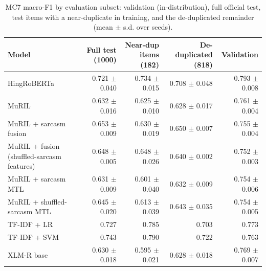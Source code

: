 \begin{table}[t]
\centering
\small
\caption{MC7 macro-F1 by evaluation subset: validation (in-distribution), full official test, test items with a near-duplicate in training, and the de-duplicated remainder (mean $\pm$ s.d. over seeds).}
\label{tab:tab05b_mc7_subsets}
\begin{tabular}{lrrrr}
\toprule
Model & Full test (1000) & Near-dup items (182) & De-duplicated (818) & Validation \\
\midrule
HingRoBERTa & 0.721 $\pm$ 0.040 & 0.734 $\pm$ 0.015 & 0.708 $\pm$ 0.048 & 0.793 $\pm$ 0.008 \\
MuRIL & 0.632 $\pm$ 0.016 & 0.625 $\pm$ 0.010 & 0.628 $\pm$ 0.017 & 0.761 $\pm$ 0.004 \\
MuRIL + sarcasm fusion & 0.653 $\pm$ 0.009 & 0.630 $\pm$ 0.019 & 0.650 $\pm$ 0.007 & 0.755 $\pm$ 0.004 \\
MuRIL + fusion (shuffled-sarcasm features) & 0.648 $\pm$ 0.005 & 0.648 $\pm$ 0.026 & 0.640 $\pm$ 0.002 & 0.752 $\pm$ 0.003 \\
MuRIL + sarcasm MTL & 0.631 $\pm$ 0.009 & 0.601 $\pm$ 0.040 & 0.632 $\pm$ 0.009 & 0.754 $\pm$ 0.006 \\
MuRIL + shuffled-sarcasm MTL & 0.645 $\pm$ 0.020 & 0.613 $\pm$ 0.039 & 0.643 $\pm$ 0.035 & 0.754 $\pm$ 0.005 \\
TF-IDF + LR & 0.727 & 0.785 & 0.703 & 0.773 \\
TF-IDF + SVM & 0.743 & 0.790 & 0.722 & 0.763 \\
XLM-R base & 0.630 $\pm$ 0.018 & 0.595 $\pm$ 0.021 & 0.628 $\pm$ 0.018 & 0.769 $\pm$ 0.007 \\
\bottomrule
\end{tabular}
\end{table}
